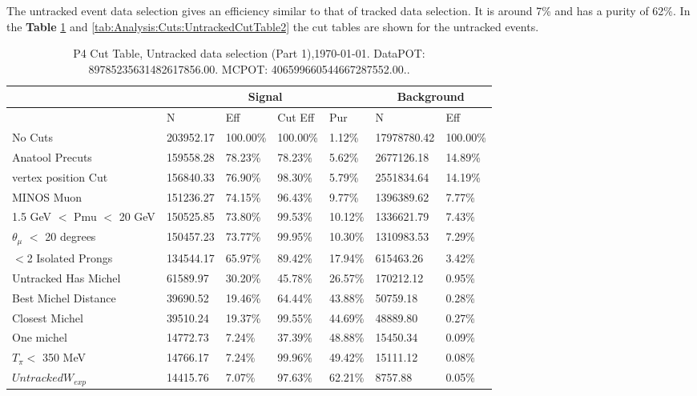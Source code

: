 The untracked event data selection gives an efficiency similar to that of tracked data selection. It is around 7\% and has a purity of 62\%. In the \textbf{Table} \ref{tab:Analysis:Cuts:UntrackedCutTable1} and \ref{tab:Analysis:Cuts:UntrackedCutTable2} the cut tables are shown for the untracked events. 

\begin{table}[!hbt]
    \tiny
    \centering
    \begin{tabular}{|*{7}{l|}}


    \hline
    & \multicolumn{4}{c|}{Signal} & \multicolumn{2}{c|}{Background} \\
    \hline
& N     & Eff     & Cut Eff & Pur    & N         & Eff   \\\hline
 No Cuts   & 203952.17     & 100.00\% & 100.00\% &   1.12\% & 17978780.42 & 100.00\% \\ \hline
 Anatool Precuts   & 159558.28     &  78.23\% &  78.23\% &   5.62\% & 2677126.18 &  14.89\% \\ \hline
 vertex position Cut   & 156840.33     &  76.90\% &  98.30\% &   5.79\% & 2551834.64 &  14.19\% \\ \hline
 MINOS Muon   & 151236.27     &  74.15\% &  96.43\% &   9.77\% & 1396389.62 &   7.77\%  \\ \hline
 1.5 GeV $<$ Pmu $<$ 20 GeV   & 150525.85     &  73.80\% &  99.53\% &  10.12\% & 1336621.79 &   7.43\%  \\ \hline
 $\theta_{\mu}$ $<$ 20 degrees   & 150457.23     &  73.77\% &  99.95\% &  10.30\% & 1310983.53 &   7.29\%  \\ \hline
 $<$2 Isolated Prongs   & 134544.17     &  65.97\% &  89.42\% &  17.94\% & 615463.26 &   3.42\%  \\ \hline
 Untracked Has Michel   & 61589.97     &  30.20\% &  45.78\% &  26.57\% & 170212.12 &   0.95\% \\ \hline
 Best Michel Distance   & 39690.52     &  19.46\% &  64.44\% &  43.88\% & 50759.18 &   0.28\% \\ \hline
 Closest Michel   & 39510.24     &  19.37\% &  99.55\% &  44.69\% & 48889.80 &   0.27\% \\ \hline
 One michel   & 14772.73     &   7.24\% &  37.39\% &  48.88\% & 15450.34 &   0.09\%  \\ \hline
 $T_\pi<$ 350 MeV   & 14766.17     &   7.24\% &  99.96\% &  49.42\% & 15111.12 &   0.08\% \\ \hline
 $Untracked W_{exp}$   & 14415.76     &   7.07\% &  97.63\% &  62.21\% & 8757.88 &   0.05\%  \\ \hline
    \end{tabular}
    \caption{P4 Cut Table, Untracked data selection (Part 1),\today. DataPOT: 89785235631482617856.00. MCPOT: 406599660544667287552.00..}
    \label{tab:Analysis:Cuts:UntrackedCutTable1}
\end{table}


